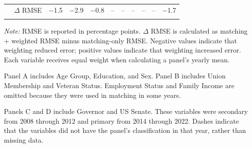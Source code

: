 \begin{table}[!htbp]
{\begin{threeparttable}
\begin{tabular}{lccccccccc}
~~$\Delta$ RMSE & $-$1.5 & $-$2.9 & $-$0.8 & -- & -- & -- & -- & -- & $-$1.7 \\
\addlinespace[0.2em]
\bottomrule
\end{tabular}%
\begin{tablenotes}
\footnotesize
\item \textit{Note:} RMSE is reported in percentage points. $\Delta$ RMSE is calculated as matching + weighted RMSE minus matching-only RMSE. Negative values indicate that weighting reduced error; positive values indicate that weighting increased error. Each variable receives equal weight when calculating a panel's yearly mean.
\item Panel A includes Age Group, Education, and Sex. Panel B includes Union Membership and Veteran Status. Employment Status and Family Income are omitted because they were used in matching in some years.
\item Panels C and D include Governor and US Senate. These variables were secondary from 2008 through 2012 and primary from 2014 through 2022. Dashes indicate that the variables did not have the panel's classification in that year, rather than missing data.
\end{tablenotes}
\end{threeparttable}%
}
\end{table}